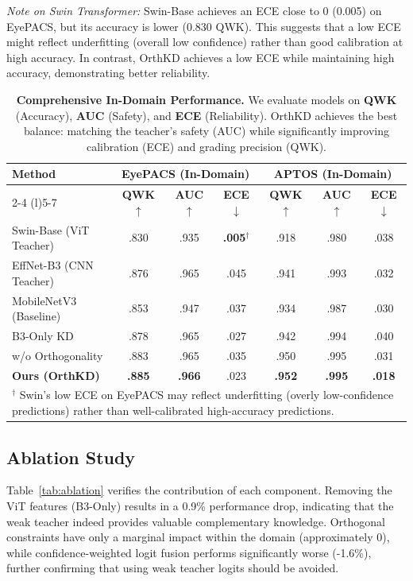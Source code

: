 \documentclass{article}
\begin{document}
\textit{Note on Swin Transformer:} Swin-Base achieves an ECE close to 0 (0.005) on EyePACS, but its accuracy is lower (0.830 QWK). This suggests that a low ECE might reflect underfitting (overall low confidence) rather than good calibration at high accuracy. In contrast, OrthKD achieves a low ECE while maintaining high accuracy, demonstrating better reliability.

\begin{table}[t]
\centering
\caption{\textbf{Comprehensive In-Domain Performance.} We evaluate models on \textbf{QWK} (Accuracy), \textbf{AUC} (Safety), and \textbf{ECE} (Reliability). OrthKD achieves the best balance: matching the teacher's safety (AUC) while significantly improving calibration (ECE) and grading precision (QWK).}
\label{tab:main_results}
\small
\setlength{\tabcolsep}{5pt}
\begin{tabular}{@{}lcccccc@{}}
\toprule
\multirow{2}{*}{\textbf{Method}} & \multicolumn{3}{c}{\textbf{EyePACS (In-Domain)}} & \multicolumn{3}{c}{\textbf{APTOS (In-Domain)}} \\
\cmidrule(lr){2-4} \cmidrule(l){5-7}
 & \textbf{QWK} $\uparrow$ & \textbf{AUC} $\uparrow$ & \textbf{ECE} $\downarrow$ & \textbf{QWK} $\uparrow$ & \textbf{AUC} $\uparrow$ & \textbf{ECE} $\downarrow$ \\
\midrule
Swin-Base (ViT Teacher) & .830 & .935 & \textbf{.005}$^\dagger$ & .918 & .980 & .038 \\
EffNet-B3 (CNN Teacher) & .876 & .965 & .045 & .941 & .993 & .032 \\
MobileNetV3 (Baseline) & .853 & .947 & .037 & .934 & .987 & .030 \\
\midrule
B3-Only KD & .878 & .965 & .027 & .942 & .994 & .040 \\
w/o Orthogonality & .883 & .965 & .035 & .950 & .995 & .031 \\
\textbf{Ours (OrthKD)} & \textbf{.885} & \textbf{.966} & .023 & \textbf{.952} & \textbf{.995} & \textbf{.018} \\
\bottomrule
\multicolumn{7}{l}{\scriptsize $^\dagger$ Swin's low ECE on EyePACS may reflect underfitting (overly low-confidence predictions) rather than well-calibrated high-accuracy predictions.}
\end{tabular}
\end{table}

\subsection{Ablation Study}
\label{sec:ablation}
Table~\ref{tab:ablation} verifies the contribution of each component. Removing the ViT features (B3-Only) results in a 0.9\% performance drop, indicating that the weak teacher indeed provides valuable complementary knowledge. Orthogonal constraints have only a marginal impact within the domain (approximately 0), while confidence-weighted logit fusion performs significantly worse (-1.6\%), further confirming that using weak teacher logits should be avoided.
\end{document}

